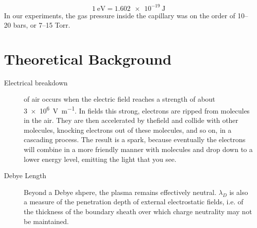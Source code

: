 ﻿\documentclass[openany]{book}
\begin{document}
$$\SI{1}{\electronvolt}=\SI{1.602e-19}{\joule}$$
In our experiments, the gas pressure inside the capillary was on the order of \numrange[range-phrase = --]{10}{20} bars, or \numrange[range-phrase = --]{7}{15} Torr.
\chapter{Theoretical Background}
\begin{description}
\item[Electrical  breakdown] of air occurs when the electric field reaches a strength of about \SI{3e6}{\volt\per\m}. In fields this strong, electrons are ripped from molecules in the air. They are then accelerated by thefield and collide with other molecules, knocking electrons out of these molecules,  and  so  on,  in  a  cascading  process.  The  result  is  a spark, because eventually the electrons will combine in a more friendly manner with molecules and drop down to a lower energy level, emitting the light that you see.
\item[Debye Length] Beyond a Debye shpere, the plasma remains effectively neutral. $\lambda_D$ is also a measure of the penetration depth of external electrostatic fields, i.e. of the thickness of the boundary sheath over which charge neutrality may not be maintained.


\end{description}
\end{document}
